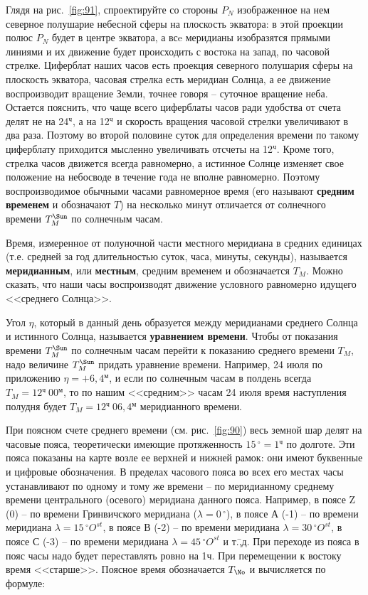\documentclass[a4paper, 12pt, twoside, final, book, russian, fittopage, cyremdash]{ncc}
\newcommand{\gr}{\ensuremath{\,^\circ}\xspace}
\newcommand{\ris}[1]{\ref{fig:#1}}
\newcommand{\Ost}{\ensuremath{{O^{st}}}\xspace}
\newcommand{\tmin}{\ensuremath{^\text{м}}\xspace}
\newcommand{\thr}{\ensuremath{^\text{ч}}\xspace}
\newcommand{\TSun}{\ensuremath{T^{\text{\Sun}}}}
\newcommand{\TNo}{\ensuremath{T_{\text{\No}}}\xspace}
\begin{document}
Глядя на рис.~\ris{91}, спроектируйте со стороны $P_N$ изображенное на нем северное полушарие небесной сферы на плоскость экватора: в этой проекции полюс $P_N$ будет в центре экватора, а всe меридианы изобразятся прямыми линиями и их движение будет происходить с востока на запад, по часовой стрелке. Циферблат наших часов есть проекция северного полушария сферы на плоскость экватора, часовая стрелка есть меридиан Солнца, а ее движение воспроизводит вращение Земли, точнее говоря \--- суточное вращение неба. Остается пояснить, что чаще всего циферблаты часов ради удобства от счета делят не на 24\thr, а на 12\thr и скорость вращения часовой стрелки увеличивают в два раза. Поэтому во второй половине суток для определения времени по такому циферблату приходится мысленно увеличивать отсчеты на 12\thr. Кроме того, стрелка часов движется всегда равномерно, а истинное Солнце изменяет свое положение на небосводе в течение года не вполне равномерно. Поэтому воспроизводимое обычными часами равномерное время (его называют \textbf{средним временем} и обозначают $T$) на несколько минут отличается от солнечного времени $\TSun_M$ по солнечным часам.

Время, измеренное от полуночной части местного меридиана в средних единицах (т.е. средней за год длительностью суток, часа, минуты, секунды), называется \textbf{меридианным}, или \textbf{местным}, средним временем и обозначается $T_M$. Можно сказать, что наши часы воспроизводят движение условного равномерно идущего <<среднего Солнца>>.

Угол $\eta$, который в данный день образуется между меридианами среднего Солнца и истинного Солнца, называется \textbf{уравнением времени}. Чтобы от показания времени $\TSun_M$ по солнечным часам перейти к показанию среднего времени $T_M$, надо величине $\TSun_M$ придать уравнение времени. Например, 24 июля по приложению $\eta = +6,4\tmin$, и если по солнечным часам в полдень всегда $T_M = 12\thr\ 00\tmin$, то по нашим <<средним>> часам 24 июля время наступления полудня будет $T_M = 12\thr\ 06,4\tmin$ меридианного времени.

При поясном счете среднего времени (см. рис.~\ris{90}) весь земной шар делят на часовые пояса, теоретически имеющие протяженность $15\gr = 1\thr$ по долготе. Эти пояса показаны на карте возле ее верхней и нижней рамок: они имеют буквенные и цифровые обозначения. В пределах часового пояса во всех его местах часы устанавливают по одному и тому же времени \--- по меридианному среднему времени центрального (осевого) меридиана данного пояса. Например, в поясе Z (0) \--- по времени Гринвичского меридиана ($\lambda = 0\gr$), в поясе А (-1) \--- по времени меридиана $\lambda = 15\gr \Ost$, в поясе В (-2) \--- по времени меридиана $\lambda = 30\gr \Ost$, в поясе С (-3) \--- по времени меридиана $\lambda = 45\gr \Ost$ и т.\=,д. При переходе из пояса в пояс часы надо будет переставлять ровно на 1ч. При перемещении к востоку время <<старше>>. Поясное время обозначается \TNo и вычисляется по формуле: 
\end{document}

